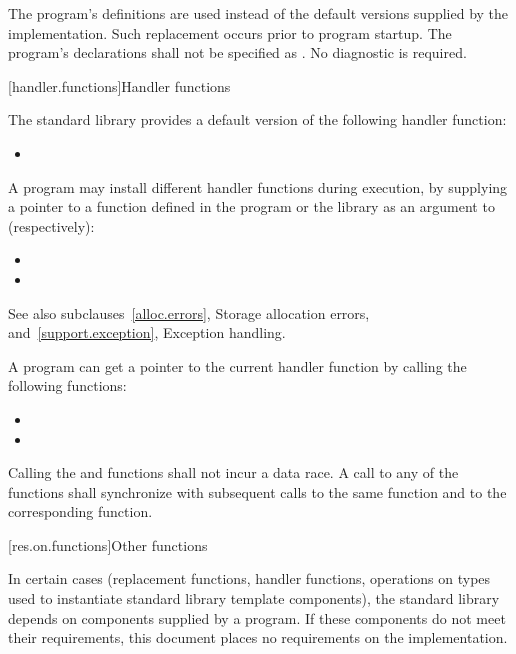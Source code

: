 \pnum
The program's definitions are used instead of the default versions supplied by
the implementation.
Such replacement occurs prior to program startup.
%
The program's declarations shall not be specified as
.
No diagnostic is required.

[handler.functions]{Handler functions}

\pnum
The \Cpp{} standard library provides a default version of the following handler
function:

\begin{itemize}
\item
{}
%
\end{itemize}

\pnum
A \Cpp{} program may install different handler functions during execution, by
supplying a pointer to a function defined in the program or the library
as an argument to (respectively):
\begin{itemize}
\item {}
\item {}
\end{itemize}
See also subclauses~\ref{alloc.errors}, Storage allocation errors, and~\ref{support.exception},
Exception handling.

\pnum
A \Cpp{} program can get a pointer to the current handler function by calling the following
functions:

\begin{itemize}
\item
{}%
\item
{}
\end{itemize}

\pnum
Calling the  and  functions shall not incur a data race. A call to
any of the  functions shall synchronize with subsequent calls to the same
 function and to the corresponding  function.

[res.on.functions]{Other functions}

\pnum
In certain cases (replacement functions, handler functions, operations on types used to
instantiate standard library template components), the \Cpp{} standard library depends on
components supplied by a \Cpp{} program.
If these components do not meet their requirements, this document places no requirements
on the implementation.

